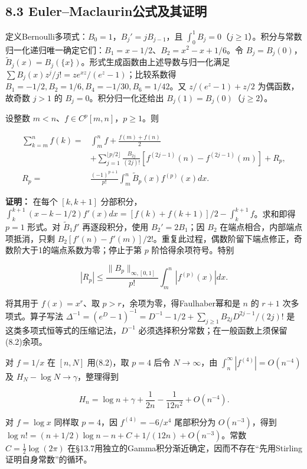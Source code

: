 \documentclass[11pt,a4paper]{article}
\begin{document}
\subsection{8.3
Euler--Maclaurin公式及其证明}\label{eulermaclaurinux516cux5f0fux53caux5176ux8bc1ux660e}

定义Bernoulli多项式：\(B_0=1\)，\(B_j'=jB_{j-1}\)，且
\(\int_0^1B_j=0\)（\(j\ge1\)）。积分与常数归一化递归唯一确定它们：\(B_1=x-1/2\)、\(B_2=x^2-x+1/6\)。令
\(B_j=B_j(0)\)，\(\widetilde B_j(x)=B_j(\{x\})\)。形式生成函数由上述导数与归一化满足
\(\sum B_j(x)z^j/j!=ze^{xz}/(e^z-1)\)；比较系数得
\(B_1=-1/2,B_2=1/6,B_4=-1/30,B_6=1/42\)。又 \(z/(e^z-1)+z/2\)
为偶函数，故奇数 \(j>1\) 的 \(B_j=0\)。积分归一化还给出
\(B_j(1)=B_j(0)\)（\(j\ge2\)）。

设整数 \(m<n\)、\(f\in C^p[m,n]\)，\(p\ge1\)。则

\[
\begin{aligned}
\sum_{k=m}^nf(k)
={}&\int_m^nf+\frac{f(m)+f(n)}2\\
&+\sum_{j=1}^{\lfloor p/2\rfloor}\frac{B_{2j}}{(2j)!}
[f^{(2j-1)}(n)-f^{(2j-1)}(m)]+R_p,\\
R_p={}&\frac{(-1)^{p+1}}{p!}\int_m^n\widetilde B_p(x)f^{(p)}(x)dx.
\end{aligned}\tag{8.2}
\]

\textbf{证明：} 在每个 \([k,k+1]\)
分部积分，\(\int_k^{k+1}(x-k-1/2)f'(x)dx=[f(k)+f(k+1)]/2-\int_k^{k+1}f\)。求和即得
\(p=1\) 形式。对 \(\widetilde B_1f'\) 再逐段积分，使用 \(B_2'=2B_1\)；因
\(B_2\) 在端点相合，内部端点项抵消，只剩
\(B_2[f'(n)-f'(m)]/2!\)。重复此过程，偶数阶留下端点修正，奇数阶大于1的端点系数为零；停止于第
\(p\) 阶恰得余项符号。特别

\[
|R_p|\le\frac{\|B_p\|_{\infty,[0,1]}}{p!}\int_m^n|f^{(p)}(x)|dx.
\]

将其用于 \(f(x)=x^r\)、取 \(p>r\)，余项为零，得Faulhaber幂和是 \(n\) 的
\(r+1\) 次多项式。算子写法
\(\Delta^{-1}=(e^D-1)^{-1}=D^{-1}-1/2+\sum_{j\ge1}B_{2j}D^{2j-1}/(2j)!\)
是这类多项式恒等式的压缩记法，\(D^{-1}\)
必须选择积分常数；在一般函数上须保留(8.2)余项。

对 \(f=1/x\) 在 \([n,N]\) 用(8.2)，取 \(p=4\) 后令 \(N\to\infty\)，由
\(\int_n^\infty|f^{(4)}|=O(n^{-4})\) 及
\(H_N-\log N\to\gamma\)，整理得到

\[
H_n=\log n+\gamma+\frac1{2n}-\frac1{12n^2}+O(n^{-4}).\tag{8.3}
\]

对 \(f=\log x\) 同样取 \(p=4\)，因 \(f^{(4)}=-6/x^4\) 尾部积分为
\(O(n^{-3})\)，得到
\(\log n!=(n+1/2)\log n-n+C+1/(12n)+O(n^{-3})\)。常数
\(C=\tfrac12\log(2\pi)\)
在§13.7用独立的Gamma积分渐近确定，因而不存在``先用Stirling证明自身常数''的循环。
\end{document}
